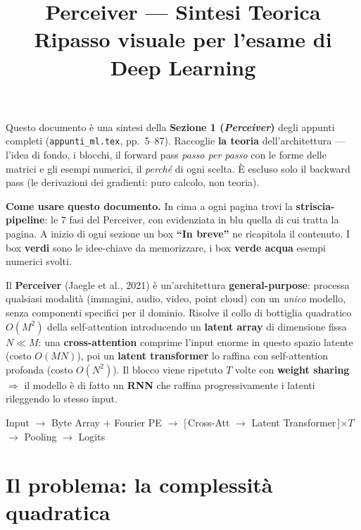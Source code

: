 \documentclass[11pt]{article}
\title{\textbf{\color{seccolor} Perceiver --- Sintesi Teorica}\\[4pt]
  \large Ripasso visuale per l'esame di Deep Learning}
\author{}
\date{}
\newcommand{\curstage}{0}
\newcommand{\stage}[1]{\gdef\curstage{#1}}
\begin{document}
\maketitle
\stage{0}
\vspace{-2.2em}

Questo documento è una sintesi della \textbf{Sezione 1 (\emph{Perceiver})} degli appunti completi (\texttt{appunti\_ml.tex}, pp.~5--87). Raccoglie \textbf{la teoria} dell'architettura --- l'idea di fondo, i blocchi, il forward pass \emph{passo per passo} con le forme delle matrici e gli esempi numerici, il \emph{perché} di ogni scelta. È escluso solo il backward pass (le derivazioni dei gradienti: puro calcolo, non teoria).

\begin{notabox}
\textbf{Come usare questo documento.} In cima a ogni pagina trovi la \textbf{striscia-pipeline}: le $7$ fasi del Perceiver, con evidenziata in blu quella di cui tratta la pagina. A inizio di ogni sezione un box \textbf{``In breve''} ne ricapitola il contenuto. I box \textbf{verdi} sono le idee-chiave da memorizzare, i box \textbf{verde acqua} esempi numerici svolti.
\end{notabox}

\begin{esamebox}[title={\textbf{Il Perceiver in 60 secondi}}]
Il \textbf{Perceiver} (Jaegle et al., 2021) è un'architettura \textbf{general-purpose}: processa qualsiasi modalità (immagini, audio, video, point cloud) con un \emph{unico} modello, senza componenti specifici per il dominio. Risolve il collo di bottiglia quadratico $O(M^2)$ della self-attention introducendo un \textbf{latent array} di dimensione fissa $N \ll M$: una \textbf{cross-attention} comprime l'input enorme in questo spazio latente (costo $O(MN)$), poi un \textbf{latent transformer} lo raffina con self-attention profonda (costo $O(N^2)$). Il blocco viene ripetuto $T$ volte con \textbf{weight sharing} $\Rightarrow$ il modello è di fatto un \textbf{RNN} che raffina progressivamente i latenti rileggendo lo stesso input.

\smallskip
\centering\small\ttfamily
Input $\to$ Byte Array $+$ Fourier PE $\to$ [\,Cross-Att $\to$ Latent Transformer\,]$\times T$ $\to$ Pooling $\to$ Logits
\end{esamebox}

{\small\tableofcontents}
\clearpage

\section{Il problema: la complessità quadratica}
\stage{0}
\end{document}
